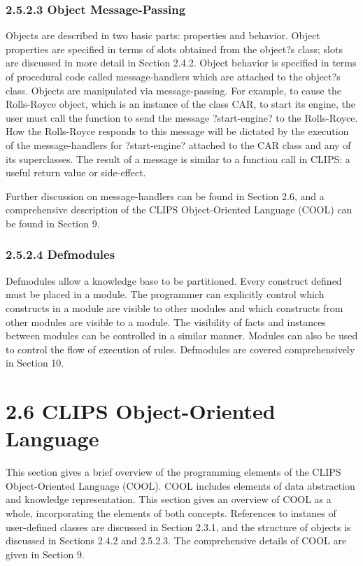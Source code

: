 \documentclass[letterpaper,10pt,english]{sphinxmanual}
\begin{document}
\subsubsection{2.5.2.3 Object Message-Passing}
\label{\detokenize{overview:object-message-passing}}
Objects are described in two basic parts: properties and behavior.
Object properties are specified in terms of slots obtained from the
object?s class; slots are discussed in more detail in Section 2.4.2.
Object behavior is specified in terms of procedural code called
message-handlers which are attached to the object?s class. Objects are
manipulated via message-passing. For example, to cause the Rolls-Royce
object, which is an instance of the class CAR, to start its engine, the
user must call the  function to send the message ?start-engine?
to the Rolls-Royce. How the Rolls-Royce responds to this message will be
dictated by the execution of the message-handlers for ?start-engine?
attached to the CAR class and any of its superclasses. The result of a
message is similar to a function call in CLIPS: a useful return value or
side-effect.

Further discussion on message-handlers can be found in Section 2.6, and
a comprehensive description of the CLIPS Object-Oriented Language (COOL)
can be found in Section 9.


\subsubsection{2.5.2.4 Defmodules}
\label{\detokenize{overview:defmodules}}
Defmodules allow a knowledge base to be partitioned. Every construct
defined must be placed in a module. The programmer can explicitly
control which constructs in a module are visible to other modules and
which constructs from other modules are visible to a module. The
visibility of facts and instances between modules can be controlled in a
similar manner. Modules can also be used to control the flow of
execution of rules. Defmodules are covered comprehensively in Section
10.


\section{2.6 CLIPS Object-Oriented Language}
\label{\detokenize{overview:clips-object-oriented-language}}
This section gives a brief overview of the programming elements of the
CLIPS Object-Oriented Language (COOL). COOL includes elements of data
abstraction and knowledge representation. This section gives an overview
of COOL as a whole, incorporating the elements of both concepts.
References to instanes of user-defined classes are discussed in Section
2.3.1, and the structure of objects is discussed in Sections 2.4.2 and
2.5.2.3. The comprehensive details of COOL are given in Section 9.
\end{document}
